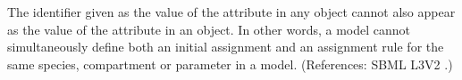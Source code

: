 The identifier given as the value of the attribute  in
any \InitialAssignment object cannot also appear as the value of the
 attribute in an \AssignmentRule object.  In other words, a
model cannot simultaneously define both an initial assignment and an
assignment rule for the same species, compartment or parameter in a model.
(References: SBML L3V2 .)
